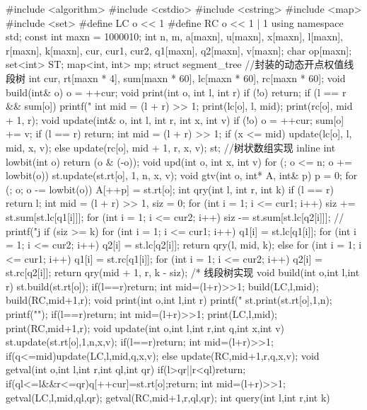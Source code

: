 \begin{cppcode}
#include <algorithm>
#include <cstdio>
#include <cstring>
#include <map>
#include <set>
#define LC o << 1
#define RC o << 1 | 1
using namespace std;
const int maxn = 1000010;
int n, m, a[maxn], u[maxn], x[maxn], l[maxn], r[maxn], k[maxn], cur, cur1, cur2,
    q1[maxn], q2[maxn], v[maxn];
char op[maxn];
set<int> ST;
map<int, int> mp;
struct segment_tree  //封装的动态开点权值线段树
{
  int cur, rt[maxn * 4], sum[maxn * 60], lc[maxn * 60], rc[maxn * 60];
  void build(int& o) { o = ++cur; }
  void print(int o, int l, int r) {
    if (!o) return;
    if (l == r && sum[o]) printf("%
    int mid = (l + r) >> 1;
    print(lc[o], l, mid);
    print(rc[o], mid + 1, r);
  }
  void update(int& o, int l, int r, int x, int v) {
    if (!o) o = ++cur;
    sum[o] += v;
    if (l == r) return;
    int mid = (l + r) >> 1;
    if (x <= mid)
      update(lc[o], l, mid, x, v);
    else
      update(rc[o], mid + 1, r, x, v);
  }
} st;
//树状数组实现
inline int lowbit(int o) { return (o & (-o)); }
void upd(int o, int x, int v) {
  for (; o <= n; o += lowbit(o)) st.update(st.rt[o], 1, n, x, v);
}
void gtv(int o, int* A, int& p) {
  p = 0;
  for (; o; o -= lowbit(o)) A[++p] = st.rt[o];
}
int qry(int l, int r, int k) {
  if (l == r) return l;
  int mid = (l + r) >> 1, siz = 0;
  for (int i = 1; i <= cur1; i++) siz += st.sum[st.lc[q1[i]]];
  for (int i = 1; i <= cur2; i++) siz -= st.sum[st.lc[q2[i]]];
  // printf("j %
  if (siz >= k) {
    for (int i = 1; i <= cur1; i++) q1[i] = st.lc[q1[i]];
    for (int i = 1; i <= cur2; i++) q2[i] = st.lc[q2[i]];
    return qry(l, mid, k);
  } else {
    for (int i = 1; i <= cur1; i++) q1[i] = st.rc[q1[i]];
    for (int i = 1; i <= cur2; i++) q2[i] = st.rc[q2[i]];
    return qry(mid + 1, r, k - siz);
  }
}
/*
线段树实现
void build(int o,int l,int r)
{
    st.build(st.rt[o]);
    if(l==r)return;
    int mid=(l+r)>>1;
    build(LC,l,mid);
    build(RC,mid+1,r);
}
void print(int o,int l,int r)
{
    printf("%
    st.print(st.rt[o],1,n);
    printf("\n");
    if(l==r)return;
    int mid=(l+r)>>1;
    print(LC,l,mid);
    print(RC,mid+1,r);
}
void update(int o,int l,int r,int q,int x,int v)
{
    st.update(st.rt[o],1,n,x,v);
    if(l==r)return;
    int mid=(l+r)>>1;
    if(q<=mid)update(LC,l,mid,q,x,v);
    else update(RC,mid+1,r,q,x,v);
}
void getval(int o,int l,int r,int ql,int qr)
{
    if(l>qr||r<ql)return;
    if(ql<=l&&r<=qr){q[++cur]=st.rt[o];return;}
    int mid=(l+r)>>1;
    getval(LC,l,mid,ql,qr);
    getval(RC,mid+1,r,ql,qr);
}
int query(int l,int r,int k)

\end{cppcode}
